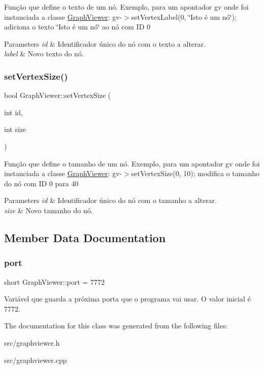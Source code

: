 Função que define o texto de um nó. Exemplo, para um apontador gv onde foi instanciada a classe \mbox{\hyperlink{class_graph_viewer}{Graph\+Viewer}}\+: gv-\/$>$set\+Vertex\+Label(0, \char`\"{}\+Isto é um nó\char`\"{}); adiciona o texto \char`\"{}\+Isto é um nó\char`\"{} ao nó com ID 0


\begin{DoxyParams}{Parameters}
{\em id} & Identificador único do nó com o texto a alterar. \\
\hline
{\em label} & Novo texto do nó. \\
\hline
\end{DoxyParams}
\mbox{\label{class_graph_viewer_ae930dfdfcdeb7a871eefb6028d74b9f9}} 
\subsubsection{\texorpdfstring{set\+Vertex\+Size()}{setVertexSize()}}
{\footnotesize\ttfamily bool Graph\+Viewer\+::set\+Vertex\+Size (\begin{DoxyParamCaption}\item[{int}]{id,  }\item[{int}]{size }\end{DoxyParamCaption})}

Função que define o tamanho de um nó. Exemplo, para um apontador gv onde foi instanciada a classe \mbox{\hyperlink{class_graph_viewer}{Graph\+Viewer}}\+: gv-\/$>$set\+Vertex\+Size(0, 10); modifica o tamanho do nó com ID 0 para 40


\begin{DoxyParams}{Parameters}
{\em id} & Identificador único do nó com o tamanho a alterar. \\
\hline
{\em size} & Novo tamanho do nó. \\
\hline
\end{DoxyParams}


\subsection{Member Data Documentation}
\mbox{\label{class_graph_viewer_a89d0abe75f41feededc49497cc514342}} 
\subsubsection{\texorpdfstring{port}{port}}
{\footnotesize\ttfamily short Graph\+Viewer\+::port = 7772\hspace{0.3cm}{\ttfamily [static]}}

Variável que guarda a próxima porta que o programa vai usar. O valor inicial é 7772. 

The documentation for this class was generated from the following files\+:\begin{DoxyCompactItemize}
\item 
src/graphviewer.\+h\item 
src/graphviewer.\+cpp\end{DoxyCompactItemize}
